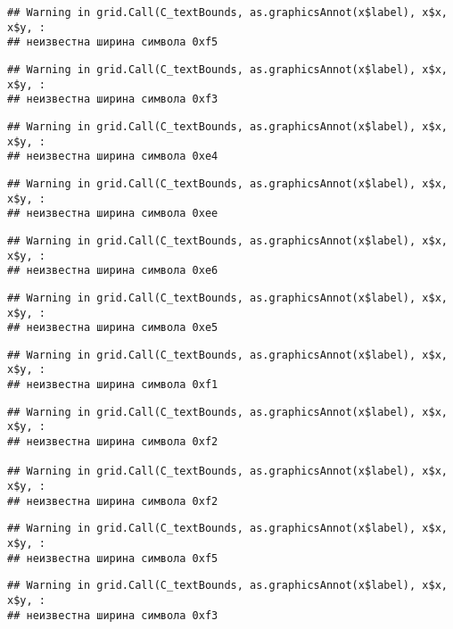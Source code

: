 \documentclass[
]{article}
\begin{document}
\begin{verbatim}
## Warning in grid.Call(C_textBounds, as.graphicsAnnot(x$label), x$x, x$y, :
## неизвестна ширина символа 0xf5
\end{verbatim}

\begin{verbatim}
## Warning in grid.Call(C_textBounds, as.graphicsAnnot(x$label), x$x, x$y, :
## неизвестна ширина символа 0xf3
\end{verbatim}

\begin{verbatim}
## Warning in grid.Call(C_textBounds, as.graphicsAnnot(x$label), x$x, x$y, :
## неизвестна ширина символа 0xe4
\end{verbatim}

\begin{verbatim}
## Warning in grid.Call(C_textBounds, as.graphicsAnnot(x$label), x$x, x$y, :
## неизвестна ширина символа 0xee
\end{verbatim}

\begin{verbatim}
## Warning in grid.Call(C_textBounds, as.graphicsAnnot(x$label), x$x, x$y, :
## неизвестна ширина символа 0xe6
\end{verbatim}

\begin{verbatim}
## Warning in grid.Call(C_textBounds, as.graphicsAnnot(x$label), x$x, x$y, :
## неизвестна ширина символа 0xe5
\end{verbatim}

\begin{verbatim}
## Warning in grid.Call(C_textBounds, as.graphicsAnnot(x$label), x$x, x$y, :
## неизвестна ширина символа 0xf1
\end{verbatim}

\begin{verbatim}
## Warning in grid.Call(C_textBounds, as.graphicsAnnot(x$label), x$x, x$y, :
## неизвестна ширина символа 0xf2

## Warning in grid.Call(C_textBounds, as.graphicsAnnot(x$label), x$x, x$y, :
## неизвестна ширина символа 0xf2
\end{verbatim}

\begin{verbatim}
## Warning in grid.Call(C_textBounds, as.graphicsAnnot(x$label), x$x, x$y, :
## неизвестна ширина символа 0xf5
\end{verbatim}

\begin{verbatim}
## Warning in grid.Call(C_textBounds, as.graphicsAnnot(x$label), x$x, x$y, :
## неизвестна ширина символа 0xf3
\end{verbatim}
\end{document}

